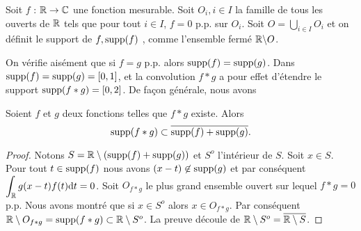 \begin{definition}
Soit $f$ : $\mathbb{R}\rightarrow \mathbb{C}$ une fonction mesurable. Soit $O_{i}, i\in I$ la  famille de tous les ouverts de $\mathbb{R}$ tels que pour tout $i\in I$, $f=0$ p.p. sur $O_{i}$. Soit $O=\bigcup_{i\in I}O_{i}$ et on d\'efinit le support de $f, \mathrm{supp}(f)$ , comme l'ensemble ferm\'e $\mathbb{R}\backslash O$.
\end{definition}
On v\'erifie ais\'ement que si $f=g$ p.p. alors $\mathrm{supp}(f)=\mathrm{supp}(g)$. Dans  $\mathrm{supp}(f)=\mathrm{supp}(g)=[0,1]$, et la  convolution $f*g$ a pour effet d'\'etendre le support $\mathrm{supp}(f*g)=[0,2]$. De fa\c{c}on g\'en\'erale, nous avons
\begin{lemma}
\label{lem:support-convolution}
Soient $f$ et $g$ deux fonctions telles que $f*g$ existe. Alors
$$
\mathrm{supp}(f*g)\subset\overline{\mathrm{supp}(f) + \mathrm{supp}(g)}.
$$
\end{lemma}
\begin{proof}
  Notons $S= \mathbb{R}\setminus (\mathrm{supp}(f)+\mathrm{supp}(g))$ et $S^{o}$ l'int\'erieur de $S$. Soit $x\in S$. Pour tout $t\in \mathrm{supp}(f)$ nous avons $(x-t)\not\in \mathrm{supp}(g)$ et par cons\'equent $\displaystyle \int_{\mathbb{R}}g(x-t)f(t)\mathrm{d} t=0$. Soit $O_{f*g}$ le plus grand ensemble ouvert sur lequel $f*g=0$ p.p.  Nous avons montr\'e que si $x\in S^{o}$ alors $x\in O_{f*g}$. Par cons\'equent $\mathbb{R}\setminus O_{f*g}=\mathrm{supp}(f*g) \subset \mathbb{R}\setminus S^{o}$. La preuve d\'ecoule de $\mathbb{R}\setminus S^{o}=\overline{\mathbb{R}\setminus S}$.
\end{proof}

